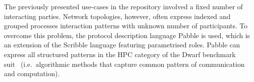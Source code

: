 The previously presented use-cases in the repository
involved a fixed number of interacting parties.
Network topologies, however, often express indexed and grouped processes interaction patterns with unknown number of participants. To overcome this problem, the protocol description
language Pabble is used, which is an extension
of the Scribble language featuring parametrised
roles.
Pabble can express all structured patterns in the
HPC category of the Dwarf benchmark
suit~\cite{BerkleyPar} (i.e.~algorithmic methods that capture common pattern of
communication and computation).


